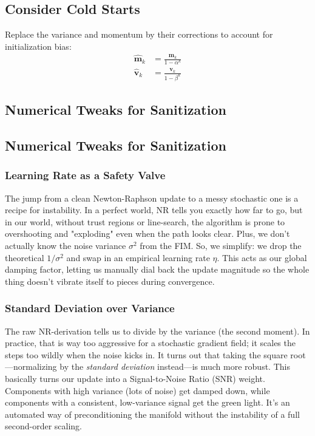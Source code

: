 \subsection*{Consider Cold Starts}
Replace the variance and momentum by their corrections to account for initialization bias:
\begin{align}
	\hat{\boldsymbol{m}}_k&=\frac{\boldsymbol{m}_k}{1-\alpha^k}\\
	\hat{\boldsymbol{v}}_k&=\frac{\boldsymbol{v}_k}{1-\beta^k}
\end{align}

\subsection*{Numerical Tweaks for Sanitization}

\subsection*{Numerical Tweaks for Sanitization}

\subsubsection*{Learning Rate as a Safety Valve}
The jump from a clean Newton-Raphson update to a messy stochastic one is a recipe for instability. In a perfect world, NR tells you exactly how far to go, but in our world, without trust regions or line-search, the algorithm is prone to overshooting and "exploding" even when the path looks clear. Plus, we don't actually know the noise variance $\sigma^2$ from the FIM. So, we simplify: we drop the theoretical $1/\sigma^2$ and swap in an empirical learning rate $\eta$. This acts as our global damping factor, letting us manually dial back the update magnitude so the whole thing doesn't vibrate itself to pieces during convergence.

\subsubsection*{Standard Deviation over Variance}
The raw NR-derivation tells us to divide by the variance (the second moment). In practice, that is way too aggressive for a stochastic gradient field; it scales the steps too wildly when the noise kicks in. It turns out that taking the square root—normalizing by the \textit{standard deviation} instead—is much more robust. This basically turns our update into a Signal-to-Noise Ratio (SNR) weight. Components with high variance (lots of noise) get damped down, while components with a consistent, low-variance signal get the green light. It’s an automated way of preconditioning the manifold without the instability of a full second-order scaling.

